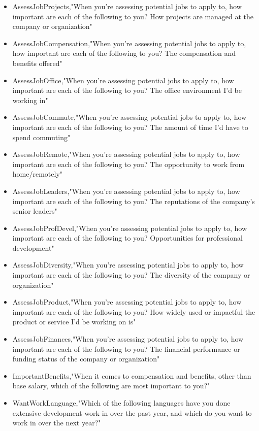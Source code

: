 \begin{appendices}
\begin{itemize}
        \item AssessJobProjects,"When you're assessing potential jobs to apply to, how important are each of the following to you? How projects are managed at the company or organization"
        \item AssessJobCompensation,"When you're assessing potential jobs to apply to, how important are each of the following to you? The compensation and benefits offered"
        \item AssessJobOffice,"When you're assessing potential jobs to apply to, how important are each of the following to you? The office environment I'd be working in"
        \item AssessJobCommute,"When you're assessing potential jobs to apply to, how important are each of the following to you? The amount of time I'd have to spend commuting"
        \item AssessJobRemote,"When you're assessing potential jobs to apply to, how important are each of the following to you? The opportunity to work from home/remotely"
        \item AssessJobLeaders,"When you're assessing potential jobs to apply to, how important are each of the following to you? The reputations of the company's senior leaders"
        \item AssessJobProfDevel,"When you're assessing potential jobs to apply to, how important are each of the following to you? Opportunities for professional development"
        \item AssessJobDiversity,"When you're assessing potential jobs to apply to, how important are each of the following to you? The diversity of the company or organization"
        \item AssessJobProduct,"When you're assessing potential jobs to apply to, how important are each of the following to you? How widely used or impactful the product or service I'd be working on is"
        \item AssessJobFinances,"When you're assessing potential jobs to apply to, how important are each of the following to you? The financial performance or funding status of the company or organization"
        \item ImportantBenefits,"When it comes to compensation and benefits, other than base salary, which of the following are most important to you?"
        \item WantWorkLanguage,"Which of the following languages have you done extensive development work in over the past year, and which do you want to work in over the next year?"

\end{itemize}
\end{appendices}
